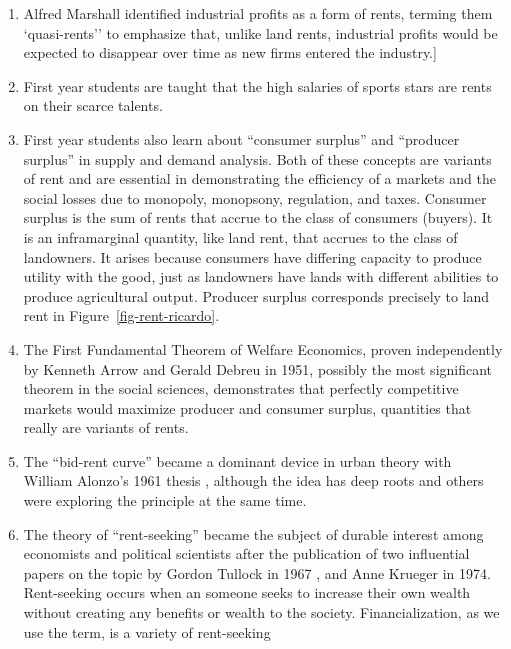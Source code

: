 \begin{enumerate}
    \item Alfred Marshall identified industrial profits as a form of rents, terming them `quasi-rents'' to emphasize that, unlike land rents, industrial profits would  be expected to disappear over time as new firms entered the industry.]
    \item First year students are taught that the high salaries of  sports stars are rents on their scarce talents. 
    \item First year students also learn about ``consumer surplus'' and ``producer surplus'' in supply and demand analysis. Both of these concepts are variants of rent and are essential in demonstrating the efficiency of a markets and the social losses due to monopoly, monopsony, regulation, and taxes. Consumer surplus is the sum of rents that accrue to the class of consumers (buyers). It is an inframarginal quantity, like land  rent, that accrues to the class of landowners. It arises because consumers have differing capacity to produce  utility with the good, just as landowners have lands with different abilities to produce agricultural output. Producer surplus corresponds precisely to land rent in Figure~\ref{fig-rent-ricardo}.  
    \item The First Fundamental Theorem of Welfare Economics, proven independently by Kenneth Arrow \cite{arrowExtensionBasicTheorems1951}and  Gerald Debreu \cite{debreuCoefficientResourceUtilization1951}  in 1951, possibly the most significant theorem in the social sciences,   demonstrates that perfectly competitive markets would maximize producer and consumer surplus, quantities that really are variants of rents.
    \item The ``\gls{bid-rent curve}'' became a dominant device  in urban theory with William Alonzo's 1961 thesis \cite{alonzoTheoryUrbanLand1960}, although the idea has deep roots and others were exploring the principle at the same time.  
    \item The theory of ``\gls{rent-seeking}''   became the subject of durable interest among economists and political scientists after the publication of two influential papers on the topic by Gordon Tullock in 1967 \cite{tullockWelfareCostsTariffs1967}, and Anne Krueger \cite{kruegerPoliticalEconomyRentSeeking1974} in 1974. Rent-seeking occurs when an someone seeks to increase their own wealth without creating any benefits or wealth to the society. Financialization, as we use the term, is a variety of rent-seeking
\end{enumerate}

